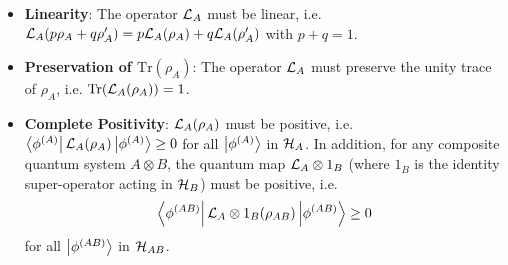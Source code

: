 \begin{itemize}
\item \textbf{Linearity}: The operator $\LA{A}$ must be linear, i.e. $\LA{A}(p\rho_A+q\rho'_A)=p\LA{A}(\rho_A)+q\LA{A}(\rho'_A)$ with $p+q=1$. 
\item \textbf{Preservation of $\mathrm{Tr}(\rho_A)$}: The operator $\LA{A}$ must preserve the unity trace of $\rho_A$, i.e. $\mathrm{Tr}(\LA{A}(\rho_A))=1$.
\item \textbf{Complete Positivity}: $\LA{A}(\rho_A)$ must be positive, i.e. $\bra{\phi^{(A)}}\LA{A}(\rho_A)\ket{\phi^{(A)}}\ge 0$ for all $\left| \phi^{(A)} \right>$ in $\begin{mathcal}H\end{mathcal}_A$. In addition, for any composite quantum system $A\otimes B$, the quantum map $\LA{A}	\otimes \mathrm{1}_B$ (where $\mathrm{1}_B$ is the identity super-operator acting in $\begin{mathcal}H\end{mathcal}_B$) must be positive, i.e. $$\bra{\phi^{(AB)}}\LA{A}\otimes\mathrm{1}_B(\rho_{AB})\ket{\phi^{(AB)}}\ge 0$$ for all $\left| \phi^{(AB)} \right>$ in $\begin{mathcal}H\end{mathcal}_{AB}$.
\end{itemize}

